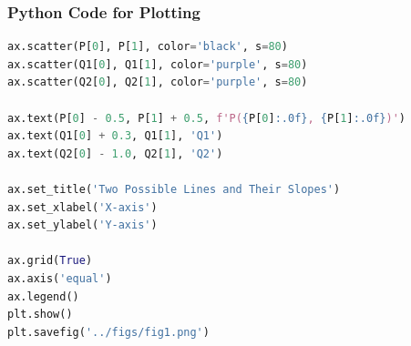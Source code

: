 \documentclass{beamer}
\theoremstyle{remark}
\numberwithin{equation}{section}
\begin{document}
\begin{frame}[fragile]
\frametitle{Python Code for Plotting}
\begin{lstlisting}[language=Python] 
ax.scatter(P[0], P[1], color='black', s=80)
ax.scatter(Q1[0], Q1[1], color='purple', s=80)
ax.scatter(Q2[0], Q2[1], color='purple', s=80)

ax.text(P[0] - 0.5, P[1] + 0.5, f'P({P[0]:.0f}, {P[1]:.0f})')
ax.text(Q1[0] + 0.3, Q1[1], 'Q1')
ax.text(Q2[0] - 1.0, Q2[1], 'Q2')

ax.set_title('Two Possible Lines and Their Slopes')
ax.set_xlabel('X-axis')
ax.set_ylabel('Y-axis')

ax.grid(True)
ax.axis('equal')
ax.legend()
plt.show()
plt.savefig('../figs/fig1.png')
\end{lstlisting}
\end{frame}
\end{document}
